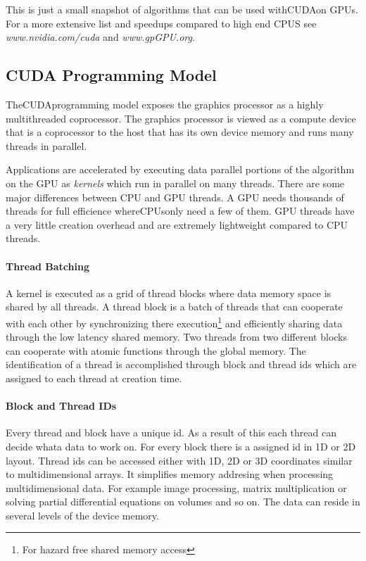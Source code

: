 This is just a small snapshot of algorithms that can be used with\gls{CUDA}on GPUs.
For a more extensive list and speedups compared to high end CPUS see 
\emph{www.nvidia.com/cuda} and \emph{www.gpGPU.org}.

\subsection*{CUDA Programming Model} %
\label{sub:cuda_programming_model}
The\gls{CUDA}programming model exposes the graphics processor as a highly
multithreaded coprocessor. The graphics processor is viewed as a compute device
that is a coprocessor to the host that has its own device memory and runs many
threads in parallel.

Applications are accelerated by executing data parallel portions of the
algorithm on the \gls{GPU} as \emph{kernels} which run in parallel on
many threads. There are some major differences between CPU and \gls{GPU} threads. 
A \gls{GPU} needs thousands of threads for full efficience where\glspl{CPU}only need a few of
them. \gls{GPU} threads have a very little creation overhead and are extremely
lightweight compared to CPU threads.

\paragraph{Thread Batching} %
\label{par:thread_batching}
A kernel is executed as a grid of thread blocks where data memory space is
shared by all threads. A thread block is a batch of threads that can cooperate
with each other by synchronizing there execution\footnote{For hazard free shared
memory access} and efficiently sharing data through the low latency shared
memory. Two threads from two different blocks can cooperate with atomic 
functions through the global memory. The identification of a thread is 
accomplished through block and thread ids which are assigned to each thread at 
creation time. 

\paragraph{Block and Thread IDs} %
\label{par:block_and_thread_ids}
Every thread and block have a unique id. As a result of this each thread can
decide whata data to work on. For every block there is a assigned id in 1D or 2D
layout. Thread ids can be accessed either with 1D, 2D or 3D coordinates similar
to multidimensional arrays. It simplifies memory addresing when processing
multidimensional data. For example image processing, matrix multiplication or
solving partial differential equations on volumes and so on. The data can reside
in several levels of the device memory. 


